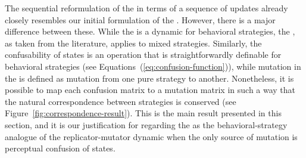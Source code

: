 The sequential reformulation of the \rmd in terms of a sequence of
updates already closely resembles our initial formulation of the
\rdd. However, there is a major difference between these. While the
\rdd is a dynamic for behavioral strategies, the \rmd, as taken from
the literature, applies to mixed strategies. Similarly, the
confusability of states is an operation that is straightforwardly
definable for behavioral strategies (see
Equations~(\ref{eq:confusion-function})), while mutation in the \rmd is
defined as mutation from one pure strategy to another. Nonetheless, it
is possible to map each confusion matrix to a mutation matrix in such
a way that the natural correspondence between strategies is conserved
(see Figure~\ref{fig:correspondence-result}). This is the main result
presented in this section, and it is our justification for regarding
the \rdd as the behavioral-strategy analogue of the replicator-mutator
dynamic when the only source of mutation is perceptual confusion of
states.

